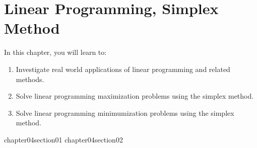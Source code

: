 \chapter{Linear Programming, Simplex Method}

In this chapter, you will learn to:

\begin{enumerate}
    \item Investigate real world applications of linear programming and related methods.
    \item Solve linear programming maximization problems using the simplex method.
    \item Solve linear programming minimumization problems using the simplex method.
\end{enumerate}


{chapter04section01}
{chapter04section02}
